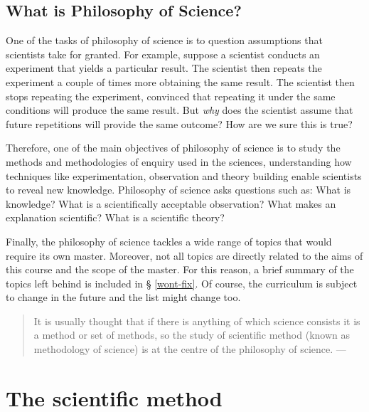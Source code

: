 \documentclass[
  12pt,
]{book}
\begin{document}
\subsection{What is Philosophy of Science?}\label{what-is-philosophy-of-science}

One of the tasks of philosophy of science is to question assumptions that scientists take for granted. For example, suppose a scientist conducts an experiment that yields a particular result. The scientist then repeats the experiment a couple of times more obtaining the same result. The scientist then stops repeating the experiment, convinced that repeating it under the same conditions will produce the same result. But \emph{why} does the scientist assume that future repetitions will provide the same outcome? How are we sure this is true?

Therefore, one of the main objectives of philosophy of science is to study the methods and methodologies of enquiry used in the sciences, understanding how techniques like experimentation, observation and theory building enable scientists to reveal new knowledge. Philosophy of science asks questions such as: What is knowledge? What is a scientifically acceptable observation? What makes an explanation scientific? What is a scientific theory?

Finally, the philosophy of science tackles a wide range of topics that would require its own master. Moreover, not all topics are directly related to the aims of this course and the scope of the master. For this reason, a brief summary of the topics left behind is included in § \ref{wont-fix}. Of course, the curriculum is subject to change in the future and the list might change too.

\begin{quote}
It is usually thought that if there is anything of which science consists it is a method or set of methods, so the study of scientific method (known as methodology of science) is at the centre of the philosophy of science. --- \citep{ladyman2012understanding}
\end{quote}

\section{The scientific method}\label{sci-method}
\end{document}
